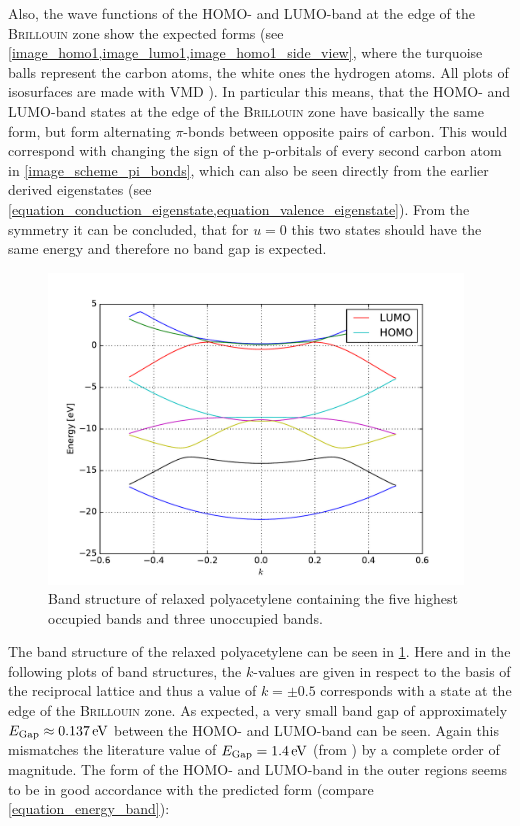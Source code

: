 Also, the wave functions of the HOMO- and LUMO-band at the edge of the \textsc{Brillouin} zone show the expected forms (see \cref{image_homo1,image_lumo1,image_homo1_side_view}, where the turquoise balls represent the carbon atoms, the white ones the hydrogen atoms. All plots of isosurfaces are made with VMD \cite{HUMP96}). In particular this means, that the HOMO- and LUMO-band states at the edge of the \textsc{Brillouin} zone have basically the same form, but form alternating $\pi$-bonds between opposite pairs of carbon. This would correspond with changing the sign of the p-orbitals of every second carbon atom in \cref{image_scheme_pi_bonds}, which can also be seen directly from the earlier derived eigenstates (see \cref{equation_conduction_eigenstate,equation_valence_eigenstate}). From the symmetry it can be concluded, that for $u=0$ this two states should have the same energy and therefore no band gap is expected.\\
\begin{figure}
	\centering
	\includegraphics[width = 11cm]{Images/polyacetylene/bands/band_structure}
	\caption{Band structure of relaxed polyacetylene containing the five highest occupied bands and three unoccupied bands.}
	\label{image_band_structure_relaxed_polyacetylene}
\end{figure}
The band structure of the relaxed polyacetylene can be seen in \cref{image_band_structure_relaxed_polyacetylene}. Here and in the following plots of band structures, the $k$-values are given in respect to the basis of the reciprocal lattice and thus a value of $k = \pm 0.5$ corresponds with a state at the edge of the \textsc{Brillouin} zone. As expected, a very small band gap of approximately $E_\text{Gap} \approx \unit[0.137]{eV}$ between the HOMO- and LUMO-band can be seen. Again this mismatches the literature value of $E_\text{Gap} = \unit[1.4]{eV}$  (from \cite{PhysRevLett.42.1698}) by a complete order of magnitude. The form of the HOMO- and LUMO-band in the outer regions seems to be in good accordance with the predicted form (compare \cref{equation_energy_band}):
